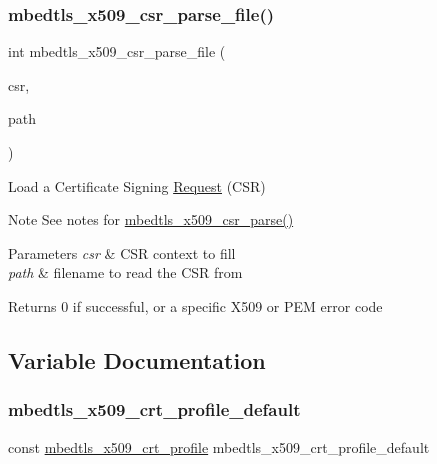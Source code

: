 \subsubsection{\texorpdfstring{mbedtls\+\_\+x509\+\_\+csr\+\_\+parse\+\_\+file()}{mbedtls\_x509\_csr\_parse\_file()}}
{\footnotesize\ttfamily int mbedtls\+\_\+x509\+\_\+csr\+\_\+parse\+\_\+file (\begin{DoxyParamCaption}\item[{\mbox{\hyperlink{structmbedtls__x509__csr}{mbedtls\+\_\+x509\+\_\+csr}} $\ast$}]{csr,  }\item[{const char $\ast$}]{path }\end{DoxyParamCaption})}



Load a Certificate Signing \mbox{\hyperlink{struct_request}{Request}} (C\+SR) 

\begin{DoxyNote}{Note}
See notes for {\ttfamily \mbox{\hyperlink{group__x509__module_ga53012fb8859f4835ccfb0a5e359b3176}{mbedtls\+\_\+x509\+\_\+csr\+\_\+parse()}}} 
\end{DoxyNote}

\begin{DoxyParams}{Parameters}
{\em csr} & C\+SR context to fill \\
\hline
{\em path} & filename to read the C\+SR from\\
\hline
\end{DoxyParams}
\begin{DoxyReturn}{Returns}
0 if successful, or a specific X509 or P\+EM error code 
\end{DoxyReturn}


\subsection{Variable Documentation}
\mbox{\label{group__x509__module_ga9cd2de10ffeff0f339abcc1ba7e26fdf}} 
\subsubsection{\texorpdfstring{mbedtls\+\_\+x509\+\_\+crt\+\_\+profile\+\_\+default}{mbedtls\_x509\_crt\_profile\_default}}
{\footnotesize\ttfamily const \mbox{\hyperlink{structmbedtls__x509__crt__profile}{mbedtls\+\_\+x509\+\_\+crt\+\_\+profile}} mbedtls\+\_\+x509\+\_\+crt\+\_\+profile\+\_\+default}

